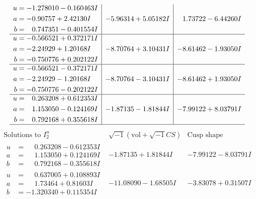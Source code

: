 \documentclass[1p]{elsarticle_modified}
\theoremstyle{definition}
\newcommand{\I}{\sqrt{-1}}
\begin{document}
$$\begin{array}{c|c|c}
\begin{aligned}
u &= -1.278010 - 0.160463 I \\
a &= -0.90757 + 2.42130 I \\
b &= \phantom{-}0.747351 - 0.401554 I\end{aligned}
 & -5.96314 + 5.05182 I & \phantom{-}1.73722 - 6.44260 I \\ \hline\begin{aligned}
u &= -0.566521 + 0.372171 I \\
a &= -2.24929 + 1.20168 I \\
b &= -0.750776 + 0.202122 I\end{aligned}
 & -8.70764 + 3.10431 I & -8.61462 - 1.93050 I \\ \hline\begin{aligned}
u &= -0.566521 - 0.372171 I \\
a &= -2.24929 - 1.20168 I \\
b &= -0.750776 - 0.202122 I\end{aligned}
 & -8.70764 - 3.10431 I & -8.61462 + 1.93050 I \\ \hline\begin{aligned}
u &= \phantom{-}0.263208 + 0.612353 I \\
a &= \phantom{-}1.153050 - 0.124169 I \\
b &= \phantom{-}0.792168 + 0.355618 I\end{aligned}
 & -1.87135 - 1.81844 I & -7.99122 + 8.03791 I\\
 \hline 
 \end{array}$$\newpage$$\begin{array}{c|c|c}  
\text{Solutions to }I^u_{2}& \I (\text{vol} + \sqrt{-1}CS) & \text{Cusp shape}\\
 \hline 
\begin{aligned}
u &= \phantom{-}0.263208 - 0.612353 I \\
a &= \phantom{-}1.153050 + 0.124169 I \\
b &= \phantom{-}0.792168 - 0.355618 I\end{aligned}
 & -1.87135 + 1.81844 I & -7.99122 - 8.03791 I \\ \hline\begin{aligned}
u &= \phantom{-}0.637005 + 0.108893 I \\
a &= \phantom{-}1.73464 + 0.81603 I \\
b &= -1.320340 + 0.115354 I\end{aligned}
 & -11.08090 - 1.68505 I & -3.83078 + 0.31507 I \\ \hline\begin{aligned}

\end{aligned}
\end{array}$$
\end{document}
